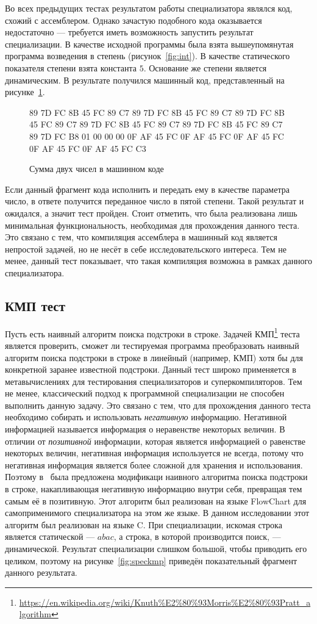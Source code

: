 Во всех предыдущих тестах результатом работы специализатора являлся код, схожий с ассемблером. Однако зачастую подобного кода оказывается недостаточно --- требуется иметь возможность запустить результат специализации. В качестве исходной программы была взята вышеупомянутая программа возведения в степень (рисунок~\ref{fig:int}). В качестве статического показателя степени взята константа $5$. Основание же степени является динамическим. В результате получился машинный код, представленный на рисунке~\ref{fig:pow}.
\begin{figure}
89 7D FC 8B 45 FC 89 C7 89 7D FC 8B 45 FC 89 C7 89 7D FC 8B 45 FC 89 C7 89 7D FC 8B 45 FC 89 C7 89 7D FC 8B 45 FC 89 C7 89 7D FC B8 01 00 00 00 0F AF 45 FC 0F AF 45 FC 0F AF 45 FC 0F AF 45 FC 0F AF 45 FC C3
\caption{ Сумма двух чисел в машинном коде}
\label{fig:pow}
\end{figure}
Если данный фрагмент кода исполнить и передать ему в качестве параметра число, в ответе получится переданное число в пятой степени. Такой результат и ожидался, а значит тест пройден. Стоит отметить, что была реализована лишь минимальная функциональность, необходимая для прохождения данного теста. Это связано с тем, что компиляция ассемблера в машинный код является непростой задачей, но не несёт в себе исследовательского интереса. Тем не менее, данный тест показывает, что такая компиляция возможна в рамках данного специализатора.


\subsection{КМП тест}
Пусть есть наивный алгоритм поиска подстроки в строке.
Задачей КМП\footnote{\url{https://en.wikipedia.org/wiki/Knuth\%E2\%80\%93Morris\%E2\%80\%93Pratt\_algorithm}} теста является проверить,
сможет ли тестируемая программа преобразовать наивный алгоритм поиска подстроки в строке в линейный (например, КМП) хотя бы
для конкретной заранее известной подстроки.
Данный тест широко применяется в метавычислениях для тестирования специализаторов и суперкомпиляторов.
Тем не менее, классический подход к программной специализации не способен выполнить данную задачу.
Это связано с тем, что для прохождения данного теста необходимо собирать и использовать \emph{негативную} информацию.
Негативной информацией называется информация о неравенстве некоторых величин.
В отличии от \emph{позитивной} информации, которая является информацией о равенстве некоторых величин,
негативная информация используется не всегда, потому что негативная информация является более сложной для
хранения и использования.
Поэтому в~\cite{PEAPG} была предложена модификаци наивного алгоритма поиска подстроки в строке,
накапливающая негативную информацию внутри себя, превращая тем самым её в позитивную.
Этот алгоритм был реализован на языке \textsf{FlowChart} для самоприменимого специализатора на этом же языке. В данном исследовании этот алгоритм был реализован на языке \textsf{C}.  При специализации, искомая строка является статической --- $abac$, а строка, в которой производится поиск, --- динамической. Результат специализации слишком большой, чтобы приводить его целиком, поэтому на рисунке~\ref{fig:speckmp} приведён показательный фрагмент данного результата. 

